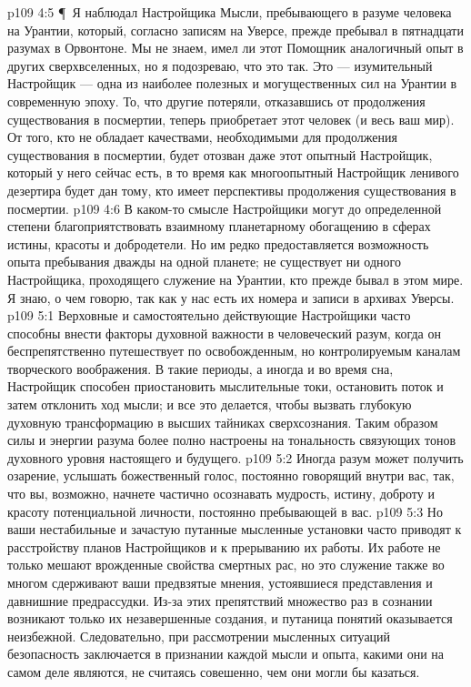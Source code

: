 \vs p109 4:5 \P\ Я наблюдал Настройщика Мысли, пребывающего в разуме человека на Урантии, который, согласно записям на Уверсе, прежде пребывал в пятнадцати разумах в Орвонтоне. Мы не знаем, имел ли этот Помощник аналогичный опыт в других сверхвселенных, но я подозреваю, что это так. Это --- изумительный Настройщик --- одна из наиболее полезных и могущественных сил на Урантии в современную эпоху. То, что другие потеряли, отказавшись от продолжения существования в посмертии, теперь приобретает этот человек (и весь ваш мир). От того, кто не обладает качествами, необходимыми для продолжения существования в посмертии, будет отозван даже этот опытный Настройщик, который у него сейчас есть, в то время как многоопытный Настройщик ленивого дезертира будет дан тому, кто имеет перспективы продолжения существования в посмертии.
\vs p109 4:6 В каком\hyp{}то смысле Настройщики могут до определенной степени благоприятствовать взаимному планетарному обогащению в сферах истины, красоты и добродетели. Но им редко предоставляется возможность опыта пребывания дважды на одной планете; не существует ни одного Настройщика, проходящего служение на Урантии, кто прежде бывал в этом мире. Я знаю, о чем говорю, так как у нас есть их номера и записи в архивах Уверсы.
\vs p109 5:1 Верховные и самостоятельно действующие Настройщики часто способны внести факторы духовной важности в человеческий разум, когда он беспрепятственно путешествует по освобожденным, но контролируемым каналам творческого воображения. В такие периоды, а иногда и во время сна, Настройщик способен приостановить мыслительные токи, остановить поток и затем отклонить ход мысли; и все это делается, чтобы вызвать глубокую духовную трансформацию в высших тайниках сверхсознания. Таким образом силы и энергии разума более полно настроены на тональность связующих тонов духовного уровня настоящего и будущего.
\vs p109 5:2 Иногда разум может получить озарение, услышать божественный голос, постоянно говорящий внутри вас, так, что вы, возможно, начнете частично осознавать мудрость, истину, доброту и красоту потенциальной личности, постоянно пребывающей в вас.
\vs p109 5:3 Но ваши нестабильные и зачастую путанные мысленные установки часто приводят к расстройству планов Настройщиков и к прерыванию их работы. Их работе не только мешают врожденные свойства смертных рас, но это служение также во многом сдерживают ваши предвзятые мнения, устоявшиеся представления и давнишние предрассудки. Из\hyp{}за этих препятствий множество раз в сознании возникают только их незавершенные создания, и путаница понятий оказывается неизбежной. Следовательно, при рассмотрении мысленных ситуаций безопасность заключается в признании каждой мысли и опыта, какими они на самом деле являются, не считаясь совешенно, чем они могли бы казаться.
